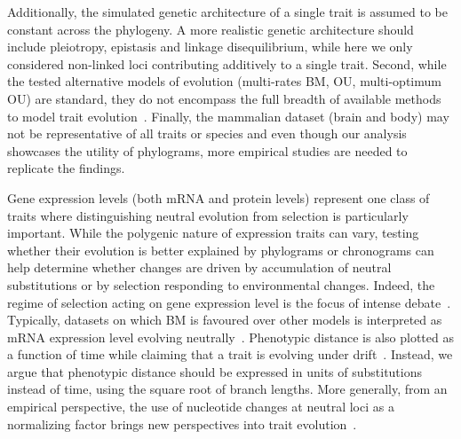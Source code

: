 \documentclass{article}
\providecommand{\DIFaddtex}[1]{{\protect\color{blue}\uwave{#1}}} %
\providecommand{\DIFaddbegin}{} %
\providecommand{\DIFaddend}{} %
\providecommand{\DIFadd}[1]{\texorpdfstring{\DIFaddtex{#1}}{#1}} %
\newcommand{\DIFaddincludegraphics}[2][]{{\color{blue}\fbox{\DIFOincludegraphics[#1]{#2}}}} %
\DeclareRobustCommand{\DIFaddbegin}{\DIFOaddbegin \let\includegraphics\DIFaddincludegraphics} %
\DeclareRobustCommand{\DIFaddend}{\DIFOaddend \let\includegraphics\DIFOincludegraphics} %
\begin{document}
Additionally, the simulated genetic architecture of a single trait is assumed to be constant across the phylogeny.
A more realistic genetic architecture should include pleiotropy, epistasis and linkage disequilibrium, while here we only considered non-linked loci contributing additively to a single trait.
Second, while the tested alternative models of evolution (multi-rates BM, OU, multi-optimum OU) are standard, they do not encompass the full breadth of available methods to model trait evolution~\citep{pennell_geiger_2014, hohna_revbayes_2016}.
Finally, the mammalian dataset (brain and body) may not be representative of all traits or species and even though our analysis showcases the utility of phylograms, more empirical studies are needed to replicate the findings.

Gene expression levels (both mRNA and protein levels) represent one class of traits where distinguishing neutral evolution from \DIFaddbegin \DIFadd{different regimes of }\DIFaddend selection is particularly important.
While the polygenic nature of expression traits can vary, testing whether their evolution is better explained by phylograms or chronograms can help determine whether changes are driven by accumulation of neutral substitutions or by selection responding to environmental changes.
Indeed, the regime of selection acting on gene expression level is the focus of intense debate~\citep{signor_evolution_2018, price_detecting_2022, bertram_cagee_2023, dimayacyac_evaluating_2023}.
Typically, datasets on which BM is favoured over other models is interpreted as mRNA expression level evolving neutrally~\citep{khaitovich_evolution_2006, catalan_drift_2019, dimayacyac_evaluating_2023}.
Phenotypic distance is also plotted as a function of time while claiming that a trait is evolving under drift~\citep{jiang_decoupling_2023}.
Instead, we argue that phenotypic distance should be expressed in units of substitutions instead of time, using the square root of branch lengths.
More generally, from an empirical perspective, the use of nucleotide changes at neutral loci as a normalizing factor brings new perspectives into trait evolution~\citep{latrille_detecting_2024}.
\end{document}
